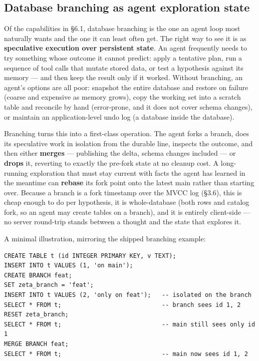 \documentclass[11pt]{article}
\begin{document}
\subsection{Database branching as agent exploration state}

Of the capabilities in \S6.1, database branching is the one an agent loop most
naturally wants and the one it can least often get. The right way to see it is as
\textbf{speculative execution over persistent state}. An agent frequently needs to
try something whose outcome it cannot predict: apply a tentative plan, run a
sequence of tool calls that mutate stored data, or test a hypothesis against its
memory --- and then keep the result only if it worked. Without branching, an agent's
options are all poor: snapshot the entire database and restore on failure (coarse
and expensive as memory grows), copy the working set into a scratch table and
reconcile by hand (error-prone, and it does not cover schema changes), or maintain
an application-level undo log (a database inside the database).

Branching turns this into a first-class operation. The agent forks a branch, does
its speculative work in isolation from the durable line, inspects the outcome, and
then either \textbf{merges} --- publishing the delta, schema changes included ---
or \textbf{drops} it, reverting to exactly the pre-fork state at no cleanup cost. A
long-running exploration that must stay current with facts the agent has learned in
the meantime can \textbf{rebase} its fork point onto the latest main rather than
starting over. Because a branch is a fork timestamp over the MVCC log (\S3.6), this
is cheap enough to do per hypothesis, it is whole-database (both rows and catalog
fork, so an agent may create tables on a branch), and it is entirely client-side ---
no server round-trip stands between a thought and the state that explores it.

A minimal illustration, mirroring the shipped branching example:

\begin{lstlisting}
CREATE TABLE t (id INTEGER PRIMARY KEY, v TEXT);
INSERT INTO t VALUES (1, 'on main');
CREATE BRANCH feat;
SET zeta_branch = 'feat';
INSERT INTO t VALUES (2, 'only on feat');   -- isolated on the branch
SELECT * FROM t;                            -- branch sees id 1, 2
RESET zeta_branch;
SELECT * FROM t;                            -- main still sees only id 1
MERGE BRANCH feat;
SELECT * FROM t;                            -- main now sees id 1, 2
\end{lstlisting}
\end{document}
